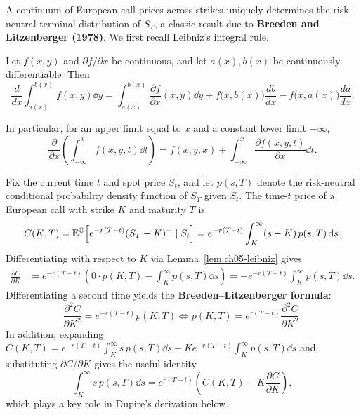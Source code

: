 A continuum of European call prices across strikes uniquely determines the risk-neutral terminal distribution of $S_T$, a classic result due to \textbf{Breeden and Litzenberger (1978)}. We first recall Leibniz's integral rule.

\begin{lemma}
    \label{lem:ch05-leibniz}
    Let $f(x, y)$ and $\partial f / \partial x$ be continuous, and let $a(x), b(x)$ be continuously differentiable. Then
    \[
        \frac{d}{dx}\int_{a(x)}^{b(x)} f(x, y)\dd y
        = \int_{a(x)}^{b(x)} \frac{\partial f}{\partial x}(x, y)\dd y
        + f\bigl(x, b(x)\bigr)\frac{db}{dx}
        - f\bigl(x, a(x)\bigr)\frac{da}{dx}.
    \]
\end{lemma}

\begin{note}
    In particular, for an upper limit equal to $x$ and a constant lower limit $-\infty$,
    \[
        \frac{\partial}{\partial x}\left(\int_{-\infty}^x f(x, y, t)\dd t\right)
        = f(x, y, x) + \int_{-\infty}^x \frac{\partial f(x, y, t)}{\partial x}\dd t.
    \]
\end{note}

Fix the current time $t$ and spot price $S_t$, and let $p(s, T)$ denote the risk-neutral conditional probability density function of $S_T$ given $S_t$. The time-$t$ price of a European call with strike $K$ and maturity $T$ is
\[
    C(K, T) = \mathbb{E}^{\mathbb{Q}}\!\left[e^{-r(T-t)}(S_T - K)^+ \mid S_t\right]
    = e^{-r(T-t)}\int_K^{\infty} (s - K)\,p(s, T)\,\mathrm{d} s.
\]
Differentiating with respect to $K$ via Lemma~\ref{lem:ch05-leibniz} gives
\begin{align*}
    \frac{\partial C}{\partial K}
    &= e^{-r(T-t)}\left(0 \cdot p(K, T) - \int_K^{\infty} p(s, T)\dd s\right)
    = -e^{-r(T-t)}\int_K^{\infty} p(s, T)\dd s.
\end{align*}
Differentiating a second time yields the \textbf{Breeden--Litzenberger formula}:
\begin{equation}
    \label{eq:ch05-breeden-litzenberger}
    \frac{\partial^2 C}{\partial K^2} = e^{-r(T-t)} p(K, T)
    \iff
    p(K, T) = e^{r(T-t)}\frac{\partial^2 C}{\partial K^2}.
\end{equation}
In addition, expanding $C(K, T) = e^{-r(T-t)}\int_K^{\infty} s\,p(s, T)\dd s - K e^{-r(T-t)}\int_K^{\infty} p(s, T)\dd s$ and substituting $\partial C/\partial K$ gives the useful identity
\begin{equation}
    \label{eq:ch05-tail-expectation}
    \int_K^{\infty} s\,p(s, T)\dd s = e^{r(T-t)}\left(C(K, T) - K\frac{\partial C}{\partial K}\right),
\end{equation}
which plays a key role in Dupire's derivation below.

